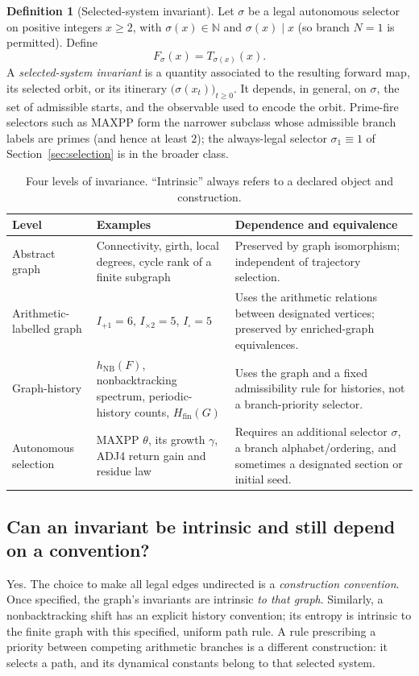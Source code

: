 \documentclass[11pt,a4paper]{article}
\theoremstyle{definition}\newtheorem{definition}[theorem]{Definition}
\newcommand{\N}{\mathbb N}
\newcommand{\NB}{\mathrm{NB}}
\begin{document}
\begin{definition}[Selected-system invariant]
Let $\sigma$ be a legal autonomous selector on positive integers $x\ge2$, with $\sigma(x)\in\N$ and $\sigma(x)\mid x$ (so branch $N=1$ is permitted). Define
\begin{equation}\label{eq:Fsigma}
F_\sigma(x)=T_{\sigma(x)}(x).
\end{equation}
A \emph{selected-system invariant} is a quantity associated to the resulting forward map, its selected orbit, or its itinerary $\bigl(\sigma(x_t)\bigr)_{t\ge0}$. It depends, in general, on $\sigma$, the set of admissible starts, and the observable used to encode the orbit. Prime-fire selectors such as MAXPP form the narrower subclass whose admissible branch labels are primes (and hence at least $2$); the always-legal selector $\sigma_1\equiv1$ of Section~\ref{sec:selection} is in the broader class.
\end{definition}

\begin{table}[htbp]
\centering\small
\caption{Four levels of invariance. ``Intrinsic'' always refers to a declared object and construction.}
\label{tab:tax}
\begin{tabularx}{\textwidth}{@{}p{29mm}X X@{}}
\toprule
\textbf{Level} & \textbf{Examples} & \textbf{Dependence and equivalence}\\
\midrule
Abstract graph & Connectivity, girth, local degrees, cycle rank of a finite subgraph & Preserved by graph isomorphism; independent of trajectory selection.\\
Arithmetic-labelled graph & $I_{+1}=6$, $I_{\times2}=5$, $I_{\square}=5$ & Uses the arithmetic relations between designated vertices; preserved by enriched-graph equivalences.\\
Graph-history & $h_{\NB}(F)$, nonbacktracking spectrum, periodic-history counts, $H_{\mathrm{fin}}(G)$ & Uses the graph and a fixed admissibility rule for histories, not a branch-priority selector.\\
Autonomous selection & MAXPP $\theta$, its growth $\gamma$, ADJ4 return gain and residue law & Requires an additional selector $\sigma$, a branch alphabet/ordering, and sometimes a designated section or initial seed.\\
\bottomrule
\end{tabularx}
\end{table}

\subsection{Can an invariant be intrinsic and still depend on a convention?}
Yes. The choice to make all legal edges undirected is a \emph{construction convention}. Once specified, the graph's invariants are intrinsic \emph{to that graph}. Similarly, a nonbacktracking shift has an explicit history convention; its entropy is intrinsic to the finite graph with this specified, uniform path rule. A rule prescribing a priority between competing arithmetic branches is a different construction: it selects a path, and its dynamical constants belong to that selected system.
\end{document}
